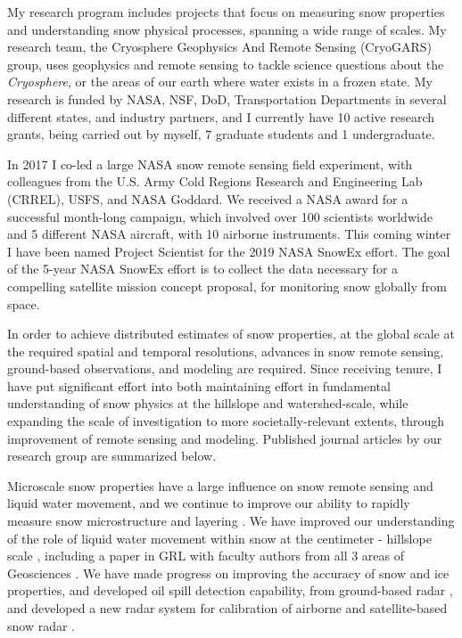 \documentclass[11pt]{article}
\begin{document}
My research program includes projects that focus on measuring snow properties and understanding snow physical processes, spanning a wide range of scales.  My research team, the Cryosphere Geophysics And Remote Sensing (CryoGARS) group, uses geophysics and remote sensing to tackle science questions about the \textit{Cryosphere}, or the areas of our earth where water exists in a frozen state.  My research is funded by NASA, NSF, DoD, Transportation Departments in several different states, and industry partners, and I currently have 10 active research grants, being carried out by myself, 7 graduate students and 1 undergraduate.  

In 2017 I co-led a large NASA snow remote sensing field experiment, with colleagues from the U.S. Army Cold Regions Research and Engineering Lab (CRREL), USFS, and NASA Goddard.  We received a NASA award for a successful month-long campaign, which involved over 100 scientists worldwide and 5 different NASA aircraft, with 10 airborne instruments.  This coming winter I have been named Project Scientist for the 2019 NASA SnowEx effort.  The goal of the 5-year NASA SnowEx effort is to collect the data necessary for a compelling satellite mission concept proposal, for monitoring snow globally from space.

In order to achieve distributed estimates of snow properties, at the global scale at the required spatial and temporal resolutions, advances in snow remote sensing, ground-based observations, and modeling are required.  Since receiving tenure, I have put significant effort into both maintaining effort in fundamental understanding of snow physics at the hillslope and watershed-scale, while expanding the scale of investigation to more societally-relevant extents, through improvement of remote sensing and modeling.  Published journal articles by our research group are summarized below.

Microscale snow properties have a large influence on snow remote sensing and liquid water movement, and we continue to improve our ability to rapidly measure snow microstructure and layering \citep{Havens:2013,Hagenmuller:2018}.  We have improved our understanding of the role of liquid water movement within snow at the centimeter - hillslope scale \citep{Eiriksson:2013,Heilig:2015}, including a paper in GRL with faculty authors from all 3 areas of Geosciences \citep{Evans:2016}.  We have made progress on improving the accuracy of snow and ice properties, and developed oil spill detection capability, from ground-based radar 
\citep{Bradford:2016,Rutter:2016,Pegau:2017}, and developed a new radar system for calibration of airborne and satellite-based 
snow radar \citep{Kim:2018}.
\end{document}
